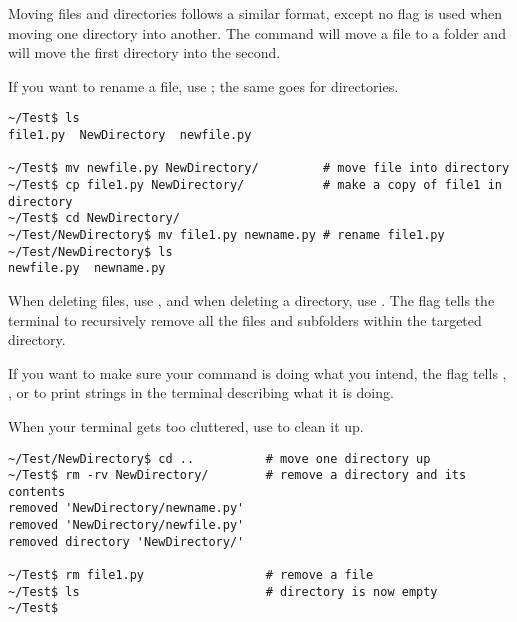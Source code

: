 Moving files and directories follows a similar format, except no  flag is used when moving one directory into another.
The command  will move a file to a folder and  will move the first directory into the second.

If you want to rename a file, use ; the same goes for directories.

\begin{lstlisting}
~/Test$ ls
file1.py  NewDirectory  newfile.py

~/Test$ mv newfile.py NewDirectory/			# move file into directory
~/Test$ cp file1.py NewDirectory/			# make a copy of file1 in directory
~/Test$ cd NewDirectory/
~/Test/NewDirectory$ mv file1.py newname.py	# rename file1.py
~/Test/NewDirectory$ ls
newfile.py  newname.py
\end{lstlisting}

When deleting files, use , and when deleting a directory, use .
The  flag tells the terminal to recursively remove all the files and subfolders within the targeted directory.

If you want to make sure your command is doing what you intend, the  flag tells , , or  to print strings in the terminal describing what it is doing.

When your terminal gets too cluttered, use  to clean it up.



\begin{lstlisting}
~/Test/NewDirectory$ cd ..			# move one directory up
~/Test$ rm -rv NewDirectory/		# remove a directory and its contents
removed 'NewDirectory/newname.py'
removed 'NewDirectory/newfile.py'
removed directory 'NewDirectory/'

~/Test$ rm file1.py 				# remove a file
~/Test$ ls							# directory is now empty
~/Test$
\end{lstlisting}



